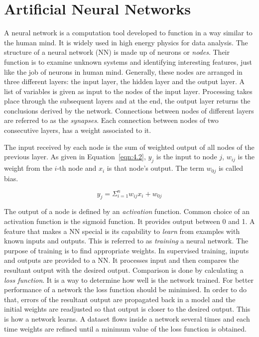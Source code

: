 \section{Artificial Neural Networks}
A neural network is a computation tool developed to function in a way similar to the human mind. It is 
widely used in high energy physics for data analysis. The structure of a neural network (NN) is made 
up of neurons or \textit{nodes}. Their function is to examine unknown systems and identifying 
interesting features, just like the job of neurons in human mind. Generally, these nodes are arranged 
in three different layers: the input layer, the hidden layer and the output layer. A list of variables 
is given as input to the nodes of the input layer. Processing takes place through the subsequent 
layers and at the end, the output layer returns the conclusions derived by the network. Connections 
between nodes of different layers are referred to as the \textit{synapses}. Each connection between 
nodes of two consecutive layers, has a weight associated to it. 


The input received by each node is the sum of weighted output of all nodes of the previous layer. 
As given in Equation~\ref{eqn:4.2}, $y_j$ is the input to node $j$, $w_{ij}$ is the weight from the 
$i$-th node and $x_i$ is that node's output. The term $w_{0j}$ is called bias. 

\begin{equation}
    y_j = \Sigma_{i=1}^{n} w_{ij}x_i + w_{0j} 
    \label{eqn:4.2}
\end{equation}


The output of a node is defined by an \textit{activation} function. Common choice of an activation 
function is the sigmoid function. It provides output between 0 and 1. A feature that makes a NN special
is its capability to \textit{learn} from examples with known inputs and outputs. This is referred to 
as \textit{training} a neural network. The purpose of training is to find appropriate weights. 
In supervised training, inputs and outputs are provided to a NN. It processes input and then compares 
the resultant output with the desired output. Comparison is done by calculating 
a \textit{loss function}. It is a way to determine how well is the network trained. For better
performance of a network the loss function should be minimised. In order to do that, errors of the 
resultant output are propagated back in a model and the initial weights are readjusted so that 
output is closer to the desired output. This is how a network learns. A dataset flows inside a 
network several times and each time weights are refined until a minimum value of the loss function 
is obtained.
